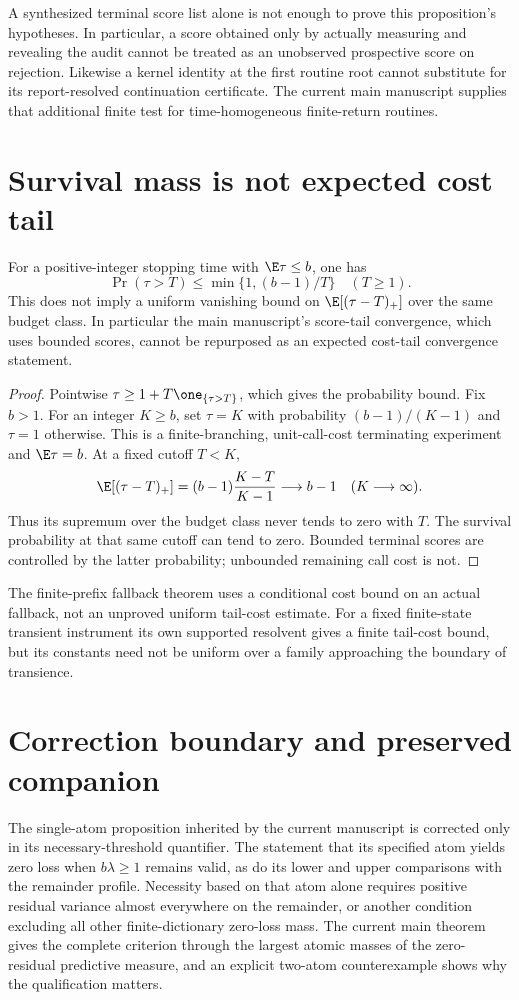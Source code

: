A synthesized terminal score list alone is not enough to prove this proposition's hypotheses. In particular, a score obtained only by actually measuring and revealing the audit cannot be treated as an unobserved prospective score on rejection. Likewise a kernel identity at the first routine root cannot substitute for its report-resolved continuation certificate. The current main manuscript supplies that additional finite test for time-homogeneous finite-return routines.

\section{Survival mass is not expected cost tail}
\begin{proposition}\label{prop:tail}
For a positive-integer stopping time with $\E\tau\le b$, one has
\[
 \Pr(\tau>T)\le\min\{1,(b-1)/T\}\quad(T\ge1).
\]
This does not imply a uniform vanishing bound on $\E[(\tau-T)_+]$ over the same budget class. In particular the main manuscript's score-tail convergence, which uses bounded scores, cannot be repurposed as an expected cost-tail convergence statement.
\end{proposition}
\begin{proof}
Pointwise $\tau\ge1+T\one_{\{\tau>T\}}$, which gives the probability bound. Fix $b>1$. For an integer $K\ge b$, set $\tau=K$ with probability $(b-1)/(K-1)$ and $\tau=1$ otherwise. This is a finite-branching, unit-call-cost terminating experiment and $\E\tau=b$. At a fixed cutoff $T<K$,
\[
 \E[(\tau-T)_+]=(b-1)\frac{K-T}{K-1}\longrightarrow b-1
 \quad(K\longrightarrow\infty).
\]
Thus its supremum over the budget class never tends to zero with $T$. The survival probability at that same cutoff can tend to zero. Bounded terminal scores are controlled by the latter probability; unbounded remaining call cost is not.
\end{proof}

The finite-prefix fallback theorem uses a conditional cost bound on an actual fallback, not an unproved uniform tail-cost estimate. For a fixed finite-state transient instrument its own supported resolvent gives a finite tail-cost bound, but its constants need not be uniform over a family approaching the boundary of transience.

\section{Correction boundary and preserved companion}
The single-atom proposition inherited by the current manuscript is corrected only in its necessary-threshold quantifier. The statement that its specified atom yields zero loss when $b\lambda\ge1$ remains valid, as do its lower and upper comparisons with the remainder profile. Necessity based on that atom alone requires positive residual variance almost everywhere on the remainder, or another condition excluding all other finite-dictionary zero-loss mass. The current main theorem gives the complete criterion through the largest atomic masses of the zero-residual predictive measure, and an explicit two-atom counterexample shows why the qualification matters.

